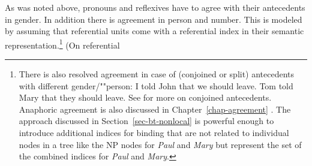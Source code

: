 \documentclass[output=paper
 	        ,biblatex
                ,babelshorthands
                ,newtxmath
                ,draftmode
                ,colorlinks, citecolor=brown
]{langscibook}
\begin{document}
As was noted above,  pronouns and reflexives have to agree with their antecedents in
gender.
In addition there is agreement in person and number. This is modeled by assuming that
referential units come with a referential index in their semantic representation.\footnote{
 There is also resolved agreement in case of (conjoined or split) antecedents with different
 gender/""person:
\eal
\ex I told John that we should leave.
\ex Tom told Mary that they should leave. \citep[]{Bresnan82c}
\zl
See 
for more on conjoined antecedents. Anaphoric agreement is also discussed in Chapter~\ref{chap-agreement}
\citep[Section~\ref{agreement:sec-anaphotic-agreement}]{chapters/agreement}. The approach discussed in
Section~\ref{sec-bt-nonlocal} is powerful enough to 
introduce additional indices for binding that are not related to individual nodes in a tree like the
NP nodes for \emph{Paul} and \emph{Mary} but represent the set of the combined indices for \emph{Paul} and
\emph{Mary}.

} (On referential
\end{document}
